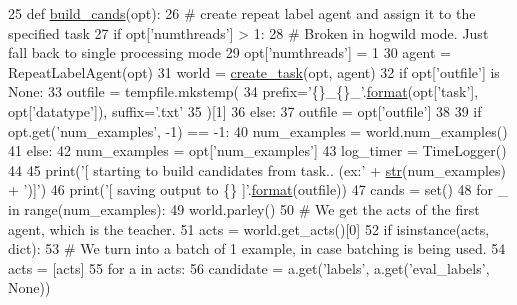 \begin{DoxyCode}
25 \textcolor{keyword}{def }\hyperlink{namespaceparlai_1_1scripts_1_1build__candidates_a7932b774b6e77c36347f89f3d79c676e}{build\_cands}(opt):
26     \textcolor{comment}{# create repeat label agent and assign it to the specified task}
27     \textcolor{keywordflow}{if} opt[\textcolor{stringliteral}{'numthreads'}] > 1:
28         \textcolor{comment}{# Broken in hogwild mode. Just fall back to single processing mode}
29         opt[\textcolor{stringliteral}{'numthreads'}] = 1
30     agent = RepeatLabelAgent(opt)
31     world = \hyperlink{namespaceparlai_1_1core_1_1worlds_a79969c7ba76d4b3c500f5bb776444dc6}{create\_task}(opt, agent)
32     \textcolor{keywordflow}{if} opt[\textcolor{stringliteral}{'outfile'}] \textcolor{keywordflow}{is} \textcolor{keywordtype}{None}:
33         outfile = tempfile.mkstemp(
34             prefix=\textcolor{stringliteral}{'\{\}\_\{\}\_'}.\hyperlink{namespaceparlai_1_1chat__service_1_1services_1_1messenger_1_1shared__utils_a32e2e2022b824fbaf80c747160b52a76}{format}(opt[\textcolor{stringliteral}{'task'}], opt[\textcolor{stringliteral}{'datatype'}]), suffix=\textcolor{stringliteral}{'.txt'}
35         )[1]
36     \textcolor{keywordflow}{else}:
37         outfile = opt[\textcolor{stringliteral}{'outfile'}]
38 
39     \textcolor{keywordflow}{if} opt.get(\textcolor{stringliteral}{'num\_examples'}, -1) == -1:
40         num\_examples = world.num\_examples()
41     \textcolor{keywordflow}{else}:
42         num\_examples = opt[\textcolor{stringliteral}{'num\_examples'}]
43     log\_timer = TimeLogger()
44 
45     print(\textcolor{stringliteral}{'[ starting to build candidates from task.. (ex:'} + \hyperlink{namespacegenerate__task__READMEs_a5b88452ffb87b78c8c85ececebafc09f}{str}(num\_examples) + \textcolor{stringliteral}{')]'})
46     print(\textcolor{stringliteral}{'[ saving output to \{\} ]'}.\hyperlink{namespaceparlai_1_1chat__service_1_1services_1_1messenger_1_1shared__utils_a32e2e2022b824fbaf80c747160b52a76}{format}(outfile))
47     cands = set()
48     \textcolor{keywordflow}{for} \_ \textcolor{keywordflow}{in} range(num\_examples):
49         world.parley()
50         \textcolor{comment}{# We get the acts of the first agent, which is the teacher.}
51         acts = world.get\_acts()[0]
52         \textcolor{keywordflow}{if} isinstance(acts, dict):
53             \textcolor{comment}{# We turn into a batch of 1 example, in case batching is being used.}
54             acts = [acts]
55         \textcolor{keywordflow}{for} a \textcolor{keywordflow}{in} acts:
56             candidate = a.get(\textcolor{stringliteral}{'labels'}, a.get(\textcolor{stringliteral}{'eval\_labels'}, \textcolor{keywordtype}{None}))

\end{DoxyCode}
